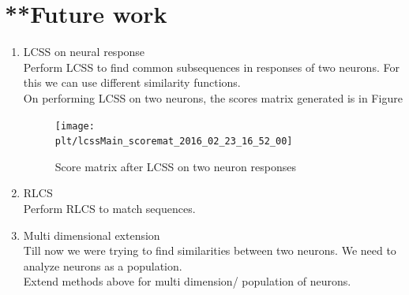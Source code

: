 \documentclass[11pt,paper=a4,answers]{exam}
\newcommand{\plt}{../../plots}
\begin{document}
\section{**Future work}
\begin{enumerate}
    \item LCSS on neural response\\
    Perform LCSS to find common subsequences in responses of two neurons. For this we can use different similarity functions.\\
    On performing LCSS on two neurons, the scores matrix generated is in Figure
    \begin{figure}
        \centering
        \texttt{[image: \\plt/lcssMain\_scoremat\_2016\_02\_23\_16\_52\_00]}
        \caption{Score matrix after LCSS on two neuron responses}
    \end{figure}
    \item RLCS\\
    Perform RLCS to match sequences.
    \item Multi dimensional extension\\
    Till now we were trying to find similarities between two neurons. We need to analyze neurons as a population.\\
    Extend methods above for multi dimension/ population of neurons.
\end{enumerate}
\end{document}
